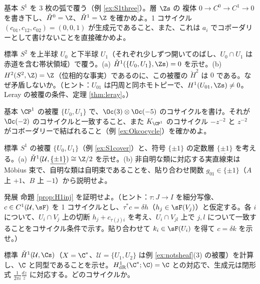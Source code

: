 \begin{prob}{基本}\label{p:S1cech}
$S^1$ を 3 枚の弧で覆う（例 \ref{ex:S1three}）。層 $\Zs$ の \Cech{} 複体 $0\to C^0\to C^1\to0$ を書き下し、$\check H^0=\Z$、$\check H^1=\Z$ を確かめよ。1 コサイクル $(c_{01},c_{12},c_{02})=(0,0,1)$ が生成元であること、また、これは $a_i$ でコボーダリーとして書けないことを直接確かめよ。
\end{prob}
\begin{prob}{標準}\label{p:S2cech}
$S^2$ を上半球 $U_0$ と下半球 $U_1$（それぞれ少しずつ開いてのばし、$U_0\cap U_1$ は赤道を含む帯状領域）で覆う。(a) $\check H^1(\{U_0,U_1\},\Zs)=0$ を示せ。(b) $H^2(S^2,\Z)=\Z$（位相的な事実）であるのに、この被覆の \Cech{} $\check H^2$ は $0$ である。なぜ矛盾しないか。（ヒント：$U_{01}$ は円周と同ホモトピーで、$H^1(U_{01},\Zs)\ne0$。Leray の被覆の条件、定理 \ref{thm:leray}。）
\end{prob}
\begin{prob}{基本}\label{p:cocycleOk}
$\CP^1$ の被覆 $\{U_0,U_1\}$ で、$\Oc(3)\otimes\Oc(-5)$ のコサイクルを書け。それが $\Oc(-2)$ のコサイクルと一致すること、また $K_{\CP^1}$ のコサイクル $-z^{-2}$ と $z^{-2}$ がコボーダリーで結ばれること（例 \ref{ex:Okcocycle}）を確かめよ。
\end{prob}
\begin{prob}{標準}\label{p:moebius}
$S^1$ の被覆 $\{U_0,U_1\}$（例 \ref{ex:S1cover}）と、符号 $\{\pm1\}$ の定数層 $\underline{\{\pm1\}}$ を考える。(a) $\check H^1(\mathcal U,\underline{\{\pm1\}})\cong\Z/2$ を示せ。(b) 非自明な類に対応する実直線束は Möbius 束で、自明な類は自明束であることを、貼り合わせ関数 $g_{01}\in\{\pm1\}$（$A$ 上 $+1$、$B$ 上 $-1$）から説明せよ。
\end{prob}
\begin{prob}{発展}\label{p:refinj}
命題 \ref{prop:H1inj} を証明せよ。（ヒント：$\tau:J\to I$ を細分写像、$c\in C^1(\mathcal U,\sF)$ を 1 コサイクルとし、$\tau^*c=\delta h$（$h_j\in\sF(V_j)$）と仮定する。各 $i$ について、$U_i\cap V_j$ 上の切断 $h_j+c_{\tau(j)i}$ を考え、$U_i\cap V_{jl}$ 上で $j,l$ について一致することをコサイクル条件で示す。貼り合わせて $k_i\in\sF(U_i)$ を得て $c=\delta k$ を示せ。）
\end{prob}
\begin{prob}{標準}\label{p:H1oneforms}
\Cech{} $\check H^1(\mathcal U,\Cs)$（$X=\C^*$、$\mathcal U=\{U_1,U_2\}$ は例 \ref{ex:notsheaf}(3) の被覆）を計算し、$\C$ と同型であることを示せ。$H^1_{\mathrm{dR}}(\C^*;\C)=\C$ との対応で、生成元は閉形式 $\frac{1}{2\pi i}\frac{dz}{z}$ に対応する。どのコサイクルか。
\end{prob}

